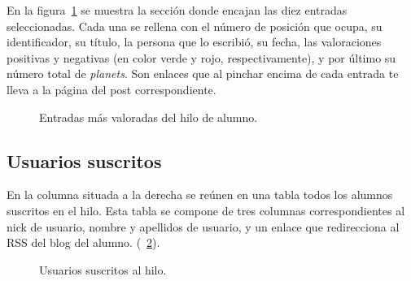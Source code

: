 \documentclass[a4paper, 12pt]{book}
\begin{document}
En la figura~\ref{figura:hiloalumno3} se muestra la secci\'on donde encajan las diez entradas seleccionadas. Cada una se rellena con el n\'umero de 
posici\'on que ocupa, su identificador, su t\'itulo, la persona que lo escribi\'o, su fecha, las valoraciones positivas y negativas (en color verde y rojo,
respectivamente), y por \'ultimo su n\'umero total de \textit{planets}. Son enlaces que al pinchar encima de cada entrada te lleva a la p\'agina del post 
correspondiente.
\begin{figure}[htbp] 
  \centering
  \caption{Entradas m\'as valoradas del hilo de alumno.}
  \label{figura:hiloalumno3}
\end{figure}

\subsection{Usuarios suscritos}
En la columna situada a la derecha se re\'unen en una tabla todos los alumnos suscritos en el hilo. Esta tabla se compone de tres columnas correspondientes
al nick de usuario, nombre y apellidos de usuario, y un enlace que redirecciona al RSS del blog del alumno. 
(~\ref{figura:hiloalumno4}).
\begin{figure}[htbp] 
  \centering
  \caption{Usuarios suscritos al hilo.}
  \label{figura:hiloalumno4}
\end{figure}
\end{document}
